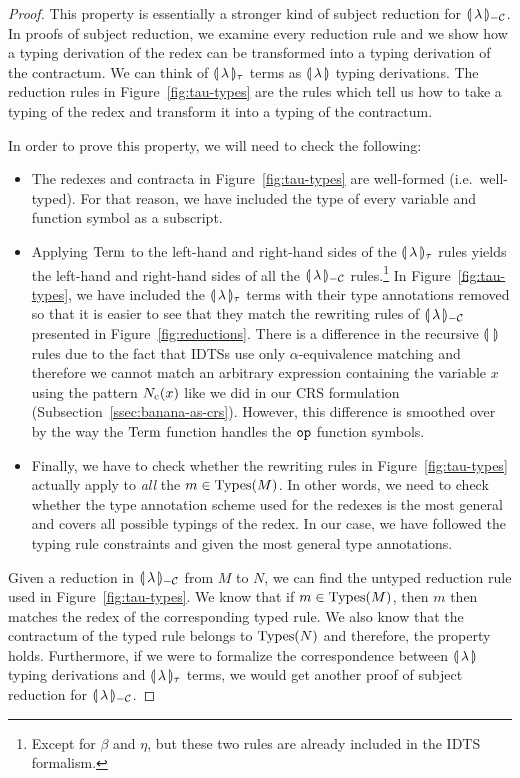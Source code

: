 \begin{proof}
  This property is essentially a stronger kind of subject reduction for
  ${\llparenthesis \, \lambda \, \rrparenthesis_{-\mathcal{C}}}$. In proofs of subject reduction, we examine every reduction
  rule and we show how a typing derivation of the redex can be transformed
  into a typing derivation of the contractum. We can think of
  $\llparenthesis \, \lambda \, \rrparenthesis_\tau$ terms as $\llparenthesis \, \lambda \, \rrparenthesis$ typing
  derivations. The reduction rules in Figure~\ref{fig:tau-types} are the
  rules which tell us how to take a typing of the redex and transform it
  into a typing of the contractum.
  
  In order to prove this property, we will need to check the following:
  \begin{itemize}
  \item The redexes and contracta in Figure~\ref{fig:tau-types} are
    well-formed (i.e.\ well-typed). For that reason, we have included the
    type of every variable and function symbol as a subscript.
  \item Applying $\operatorname{Term}$ to the left-hand and right-hand sides of the
    $\llparenthesis \, \lambda \, \rrparenthesis_\tau$ rules yields the left-hand and right-hand sides
    of all the ${\llparenthesis \, \lambda \, \rrparenthesis_{-\mathcal{C}}}$ rules.\footnote{Except for $\beta$ and $\eta$,
      but these two rules are already included in the IDTS formalism.} In
    Figure~\ref{fig:tau-types}, we have included the ${\llparenthesis \, \lambda \, \rrparenthesis_\tau}$ terms with
    their type annotations removed so that it is easier to see that they
    match the rewriting rules of ${\llparenthesis \, \lambda \, \rrparenthesis_{-\mathcal{C}}}$ presented in
    Figure~\ref{fig:reductions}. There is a difference in the recursive
    $\llparenthesis \,  \, \rrparenthesis$ rules due to the fact that IDTSs use only
    $\alpha$-equivalence matching and therefore we cannot match an
    arbitrary expression containing the variable $x$ using the pattern
    $N_{\mathrm{c}}(x)$ like we did in our CRS formulation
    (Subsection~\ref{ssec:banana-as-crs}). However, this difference is
    smoothed over by the way the $\operatorname{Term}$ function handles the $\mathtt{op}$
    function symbols.
  \item Finally, we have to check whether the rewriting rules in
    Figure~\ref{fig:tau-types} actually apply to \emph{all} the
    $m \in \operatorname{Types}(M)$. In other words, we need to check whether the type
    annotation scheme used for the redexes is the most general and covers
    all possible typings of the redex. In our case, we have followed the
    typing rule constraints and given the most general type annotations.
  \end{itemize}
  
  Given a reduction in ${\llparenthesis \, \lambda \, \rrparenthesis_{-\mathcal{C}}}$ from $M$ to $N$, we can find the untyped
  reduction rule used in Figure~\ref{fig:tau-types}. We know that if
  $m \in \operatorname{Types}(M)$, then $m$ then matches the redex of the corresponding
  typed rule. We also know that the contractum of the typed rule belongs to
  $\operatorname{Types}(N)$ and therefore, the property holds. Furthermore, if we were to
  formalize the correspondence between $\llparenthesis \, \lambda \, \rrparenthesis$ typing
  derivations and $\llparenthesis \, \lambda \, \rrparenthesis_\tau$ terms, we would get another proof
  of subject reduction for ${\llparenthesis \, \lambda \, \rrparenthesis_{-\mathcal{C}}}$.
\end{proof}

